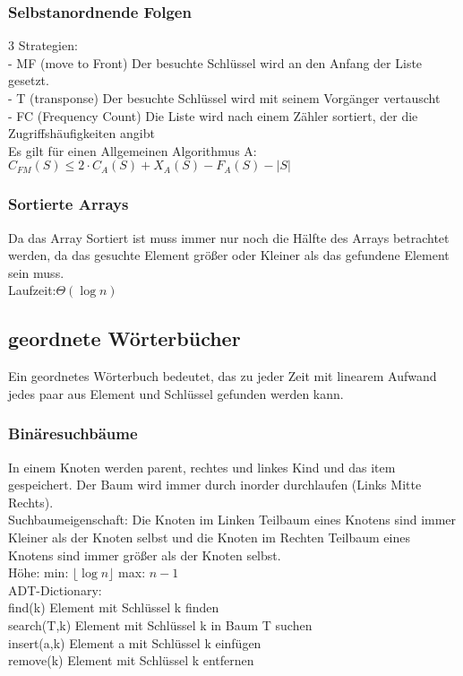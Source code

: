 \documentclass[a4paper]{scrartcl}
\begin{document}
\subsubsection{Selbstanordnende Folgen}
3 Strategien:\\
- MF (move to Front) Der besuchte Schlüssel wird an den Anfang der Liste gesetzt.\\
- T (transponse) Der besuchte Schlüssel wird mit seinem Vorgänger vertauscht\\
- FC (Frequency Count) Die Liste wird nach einem Zähler sortiert, der die Zugriffshäufigkeiten angibt\\
Es gilt für einen Allgemeinen Algorithmus A:\\
$C_{FM}(S) \leq 2\cdot C_{A}(S) + X_{A}(S) - F_{A}(S) - |S|$\\
\subsubsection{Sortierte Arrays}
Da das Array Sortiert ist muss immer nur noch die Hälfte des Arrays betrachtet werden, da das gesuchte Element größer oder Kleiner als das gefundene Element sein muss.\\
Laufzeit:$\Theta(\log n)$\\
\subsection{geordnete Wörterbücher}
Ein geordnetes Wörterbuch bedeutet, das zu jeder Zeit mit linearem Aufwand jedes paar aus Element und Schlüssel gefunden werden kann.
\subsubsection{Binäresuchbäume}
In einem Knoten werden parent, rechtes und linkes Kind und das item gespeichert. Der Baum wird immer durch inorder durchlaufen (Links Mitte Rechts).\\
Suchbaumeigenschaft: Die Knoten im Linken Teilbaum eines Knotens sind immer Kleiner als der Knoten selbst und die Knoten im Rechten Teilbaum eines Knotens sind immer größer als der Knoten selbst.\\
Höhe: min: $\lfloor \log n \rfloor$ max: $n-1$\\
ADT-Dictionary:\\
find(k) Element mit Schlüssel k finden\\
search(T,k) Element mit Schlüssel k in Baum T suchen\\
insert(a,k) Element a mit Schlüssel k einfügen\\
remove(k) Element mit Schlüssel k entfernen\\
\end{document}
